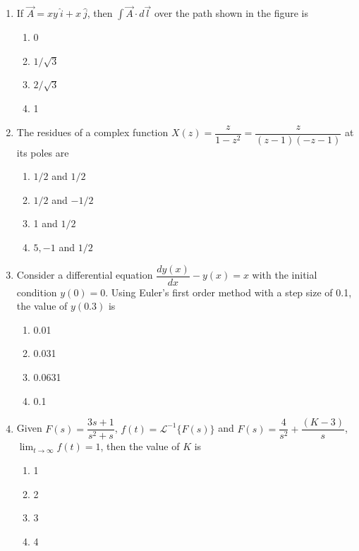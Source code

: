\documentclass[journal,12pt,onecolumn]{IEEEtran}
\begin{document}
\begin{enumerate}
\item If $\vec{A}=xy\ \hat{i}+x\ \hat{j}$, then $\int \vec{A}\cdot d\vec{l}$ over the path shown in the figure is
\begin{multicols}{2}
\begin{enumerate}
\item 0
\item $1/\sqrt{3}$
\item $2/\sqrt{3}$
\item 1
\end{enumerate}
\end{multicols}

\item The residues of a complex function $X(z)=\dfrac{z}{1-z^2}=\dfrac{z}{(z-1)(-z-1)}$ at its poles are
\begin{multicols}{2}
\begin{enumerate}
\item $1/2$ and $1/2$
\item $1/2$ and $-1/2$
\item 1 and $1/2$
\item $5,-1$ and $1/2$
\end{enumerate}
\end{multicols}

\item Consider a differential equation $\dfrac{dy(x)}{dx}-y(x)=x$ with the initial condition $y(0)=0$. Using Euler's first order method with a step size of 0.1, the value of $y(0.3)$ is
\begin{multicols}{2}
\begin{enumerate}
\item 0.01
\item 0.031
\item 0.0631
\item 0.1
\end{enumerate}
\end{multicols}

\item Given $F(s)=\dfrac{3s+1}{s^2+s}$, $f(t)=\mathcal{L}^{-1}\{F(s)\}$ and $F(s)=\dfrac{4}{s^2}+\dfrac{(K-3)}{s}$, $\lim_{t\to\infty} f(t)=1$, then the value of $K$ is
\begin{multicols}{2}
\begin{enumerate}
\item 1
\item 2
\item 3
\item 4
\end{enumerate}
\end{multicols}


\end{enumerate}
\end{document}

